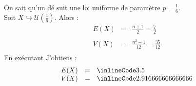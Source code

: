 
\bigskip

On sait qu'un dé suit une loi uniforme de paramètre $p = \frac{1}{6}$.\\
Soit $X \hookrightarrow \mathcal{U}\left(\frac{1}{6}\right)$. Alors :
\[
  \begin{array}{rcl}
    E(X) & = & \frac{n+1}{2} = \frac{7}{2}      \\\\
    V(X) & = & \frac{n^2-1}{12} = \frac{35}{12} \\
  \end{array}
\]
En exécutant 
J'obtiens :
\[
  \begin{array}{rcl}
    E(X) & = & \il{3.5}               \\
    V(X) & = & \il{2.916666666666666} \\
  \end{array}
\]
